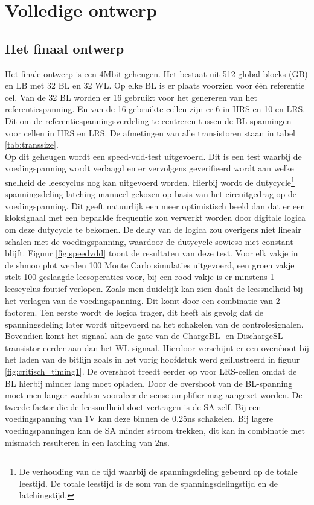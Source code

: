 \chapter{Volledige ontwerp}
\label{final}
\section{Het finaal ontwerp}
Het finale ontwerp is een 4Mbit geheugen. Het bestaat uit 512 global blocks (GB) en LB met 32 BL en 32 WL. Op elke BL is er plaats voorzien voor één referentie cel. Van de 32 BL worden er 16 gebruikt voor het genereren van het referentiespanning. En van de 16 gebruikte cellen zijn er 6 in HRS en 10 en LRS. Dit om de referentiespanningsverdeling te centreren tussen de BL-spanningen voor cellen in HRS en LRS. De afmetingen van alle transistoren staan in tabel \ref{tab:transsize}. \\
Op dit geheugen wordt een speed-vdd-test uitgevoerd. Dit is een test waarbij de voedingspanning wordt verlaagd en er vervolgens geverifieerd wordt aan welke snelheid de leescyclus nog kan uitgevoerd worden. Hierbij wordt de dutycycle\footnote{De verhouding van de tijd waarbij de spanningsdeling gebeurd op de totale leestijd. De totale leestijd is de som van de spanningsdelingstijd en de latchingstijd.} spanningsdeling-latching manueel gekozen op basis van het circuitgedrag op de voedingspanning. Dit geeft natuurlijk een meer optimistisch beeld dan dat er een kloksignaal met een bepaalde frequentie zou verwerkt worden door digitale logica om deze dutycycle te bekomen. De delay van de logica zou overigens niet lineair schalen met de voedingspanning, waardoor de dutycycle sowieso niet constant blijft. Figuur \ref{fig:speedvdd} toont de resultaten van deze test. Voor elk vakje in de shmoo plot werden 100 Monte Carlo simulaties uitgevoerd, een groen vakje stelt 100 geslaagde leesoperaties voor, bij een rood vakje is er minstens 1 leescyclus foutief verlopen. Zoals men duidelijk kan zien  daalt de leessnelheid bij het verlagen van de voedingspanning. Dit komt door een combinatie van 2 factoren. Ten eerste wordt de logica trager, dit heeft als gevolg dat de spanningsdeling later wordt uitgevoerd na het schakelen van de controlesignalen. Bovendien komt het signaal aan de gate van de ChargeBL- en DischargeSL-transistor eerder aan dan het WL-signaal. Hierdoor verschijnt er een overshoot bij het laden van de bitlijn zoals in het vorig hoofdstuk werd geillustreerd in figuur \ref{fig:critisch_timing1}. De overshoot treedt eerder op voor LRS-cellen omdat de BL hierbij minder lang moet opladen. Door de overshoot van de BL-spanning moet men langer wachten vooraleer de sense amplifier mag aangezet worden. De tweede factor die de leessnelheid doet vertragen is de SA zelf. Bij een voedingspanning van 1V kan deze binnen de 0.25ns schakelen. Bij lagere voedingspanningen kan de SA minder stroom trekken, dit kan in combinatie met mismatch resulteren in een latching van 2ns.

